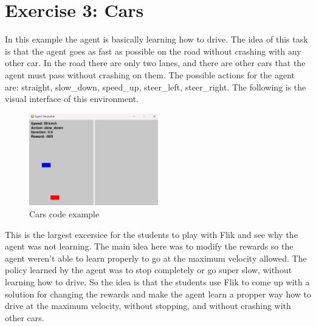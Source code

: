 \section{Exercise 3: Cars}
In this example the agent is basically learning how to drive. The idea of this task is that the agent goes as 
fast as possible on the road without crashing with any other car. In the road there are only two lanes, and there 
are other cars that the agent must pass without crashing on them. The possible actions for the agent are: 
straight, slow\_down, speed\_up, steer\_left, steer\_right. The following is the visual interface of this environment.

\begin{figure}[h]
    \centering
    \includegraphics[width=0.5\textwidth]{figures/cars_example.png}
    \caption{Cars code example}
    \label{fig:cars-code-example}
\end{figure}

This is the largest excersice for the students to play with Flik and see why the agent was not learning. The main 
idea here was to modify the rewards so the agent weren't able to learn properly to go at the maximum velocity allowed.
The policy learned by the agent was to stop completely or go super slow, without learning how to drive. So the idea 
is that the students use Flik to come up with a solution for changing the rewards and make the agent learn a propper 
way how to drive at the maximum velocity, without stopping, and without crashing with other cars.


